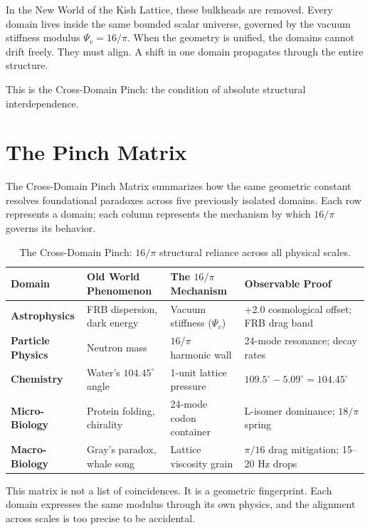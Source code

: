 \documentclass[11pt, letterpaper, openany]{book}
\begin{document}
In the New World of the Kish Lattice, these bulkheads are removed. Every domain lives inside the
same bounded scalar universe, governed by the vacuum stiffness modulus $\Psi_v = 16/\pi$. When
the geometry is unified, the domains cannot drift freely. They must align. A shift in one domain
propagates through the entire structure.

This is the Cross-Domain Pinch: the condition of absolute structural interdependence.

\section*{The Pinch Matrix}
The Cross-Domain Pinch Matrix summarizes how the same geometric constant resolves foundational
paradoxes across five previously isolated domains. Each row represents a domain; each column
represents the mechanism by which $16/\pi$ governs its behavior.

\begin{table}[h]
\centering
\renewcommand{\arraystretch}{1.5}
\begin{tabular}{|p{}|p{}|p{}|p{}|}
\hline
\textbf{Domain} & \textbf{Old World Phenomenon} & \textbf{The $16/\pi$ Mechanism} & \textbf{Observable Proof} \\
\hline
\hline
\textbf{Astrophysics} & FRB dispersion, dark energy & Vacuum stiffness ($\Psi_v$) & +2.0 cosmological offset; FRB drag band \\
\hline
\textbf{Particle Physics} & Neutron mass & $16/\pi$ harmonic wall & 24-mode resonance; decay rates \\
\hline
\textbf{Chemistry} & Water’s $104.45^\circ$ angle & 1-unit lattice pressure & $109.5^\circ - 5.09^\circ = 104.45^\circ$ \\
\hline
\textbf{Micro-Biology} & Protein folding, chirality & 24-mode codon container & L-isomer dominance; $18/\pi$ spring \\
\hline
\textbf{Macro-Biology} & Gray’s paradox, whale song & Lattice viscosity grain & $\pi/16$ drag mitigation; 15–20 Hz drops \\
\hline
\end{tabular}
\caption{The Cross-Domain Pinch: $16/\pi$ structural reliance across all physical scales.}
\label{table:cross_domain_pinch}
\end{table}

This matrix is not a list of coincidences. It is a geometric fingerprint. Each domain expresses the
same modulus through its own physics, and the alignment across scales is too precise to be
accidental.
\end{document}
